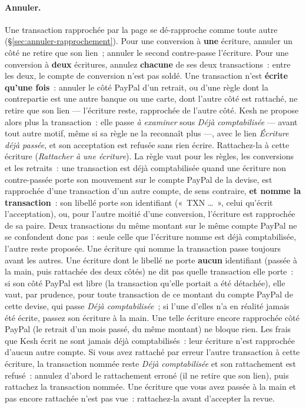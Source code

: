 \documentclass[a4paper,11pt,oneside]{article}
\begin{document}
\paragraph{Annuler.} Une transaction rapprochée par la page se dé-rapproche comme toute autre (\S\ref{sec:annuler-rapprochement}). Pour une conversion à \textbf{une} écriture, annuler un côté ne retire que son lien~; annuler le second contre-passe l'écriture. Pour une conversion à \textbf{deux} écritures, annulez \textbf{chacune} de ses deux transactions~: entre les deux, le compte de conversion n'est pas soldé. Une transaction n'est \textbf{écrite qu'une fois}~: annuler le côté PayPal d'un retrait, ou d'une règle dont la contrepartie est une autre banque ou une carte, dont l'autre côté est rattaché, ne retire que son lien --- l'écriture reste, rapprochée de l'autre côté. Kesh ne propose alors plus la transaction~: elle passe \emph{à examiner} sous \emph{Déjà comptabilisée} --- avant tout autre motif, même si sa règle ne la reconnaît plus ---, avec le lien \emph{Écriture déjà passée}, et son acceptation est refusée sans rien écrire. Rattachez-la à cette écriture (\emph{Rattacher à une écriture}). La règle vaut pour les règles, les conversions et les retraits~: une transaction est déjà comptabilisée quand une écriture non contre-passée porte son mouvement sur le compte PayPal de la devise, est rapprochée d'une transaction d'un autre compte, de sens contraire, \textbf{et nomme la transaction}~: son libellé porte son identifiant («~TXN \ldots~», celui qu'écrit l'acceptation), ou, pour l'autre moitié d'une conversion, l'écriture est rapprochée de sa paire. Deux transactions du même montant sur le même compte PayPal ne se confondent donc pas~: seule celle que l'écriture nomme est déjà comptabilisée, l'autre reste proposée. Une écriture qui nomme la transaction passe toujours avant les autres. Une écriture dont le libellé ne porte \textbf{aucun} identifiant (passée à la main, puis rattachée des deux côtés) ne dit pas quelle transaction elle porte~: si son côté PayPal est libre (la transaction qu'elle portait a été détachée), elle vaut, par prudence, pour toute transaction de ce montant du compte PayPal de cette devise, qui passe \emph{Déjà comptabilisée}~; si l'une d'elles n'a en réalité jamais été écrite, passez son écriture à la main. Une telle écriture encore rapprochée côté PayPal (le retrait d'un mois passé, du même montant) ne bloque rien. Les frais que Kesh écrit ne sont jamais déjà comptabilisés~: leur écriture n'est rapprochée d'aucun autre compte. Si vous avez rattaché par erreur l'autre transaction à cette écriture, la transaction nommée reste \emph{Déjà comptabilisée} et son rattachement est refusé~: annulez d'abord le rattachement erroné (il ne retire que son lien), puis rattachez la transaction nommée. Une écriture que vous avez passée à la main et pas encore rattachée n'est pas vue~: rattachez-la avant d'accepter la revue.
\end{document}
